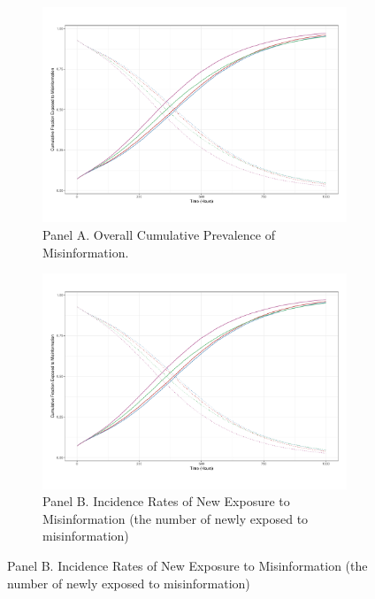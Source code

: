 \documentclass[man, 12pt, a4paper, nolmodern, noextraspace]{apa6}
\begin{document}
\begin{figure}
    \centering
    
    \begin{subfigure}[t]{0.8\textwidth}
        \centering
        \includegraphics[clip, width=\linewidth, page = 1]{draft/Figure_2__Prevalence.pdf} 
        \captionsetup{font=small}
        \caption*{Panel A. Overall Cumulative Prevalence of Misinformation.}
    \end{subfigure}
  
    \begin{subfigure}[t]{0.8\textwidth}
        \centering
        \includegraphics[clip, width=\linewidth, page = 2]{draft/Figure_2__Prevalence.pdf} 
        \captionsetup{font=small}
        \caption*{Panel B. Incidence Rates of New Exposure to Misinformation (the number of newly exposed to misinformation)}
    \end{subfigure}
    

\end{figure}
\end{document}
